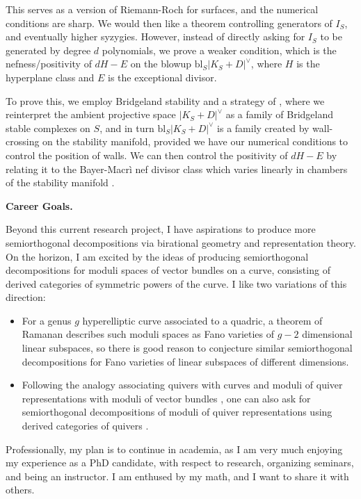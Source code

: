 \documentclass[12pt]{article}
\begin{document}
This serves as a version of Riemann-Roch for surfaces, and the numerical conditions are sharp. We would then like a theorem controlling generators of $I_S$, and eventually higher syzygies. However, instead of directly asking for $I_S$ to be generated by degree $d$ polynomials, we prove a weaker condition, which is the nefness/positivity of $dH - E$ on the blowup $\mathrm{bl}_S |K_S+D|^\vee$, where $H$ is the hyperplane class and $E$ is the exceptional divisor.

To prove this, we employ Bridgeland stability and a strategy of \cite{Arcara_Bertram_2009}, where we reinterpret the ambient projective space $|K_S+D|^\vee$ as a family of Bridgeland stable complexes on $S$, and in turn $\mathrm{bl}_S |K_S+D|^\vee$ is a family created by wall-crossing on the stability manifold, provided we have our numerical conditions to control the position of walls. We can then control the positivity of $dH-E$ by relating it to the Bayer-Macr\`i nef divisor class which varies linearly in chambers of the stability manifold \cite{Bayer_Macrì_2014}.



\textbf{\large Career Goals.}

Beyond this current research project, I have aspirations to produce more semiorthogonal decompositions via birational geometry and representation theory. On the horizon, I am excited by the ideas of \cite{Tevelev_Torres_2023,Tevelev_2023} producing semiorthogonal decompositions for moduli spaces of vector bundles on a curve, consisting of derived categories of symmetric powers of the curve. I like two variations of this direction:

\begin{itemize}
    \item For a genus $g$ hyperelliptic curve associated to a quadric, a theorem of Ramanan \cite{Desale_Ramanan_1976} describes such moduli spaces as Fano varieties of $g-2$ dimensional linear subspaces, so there is good reason \cite{Belmans_Bose_Frei_Gould_Hotchkiss_Lamarche_Petok_Avila_Shah} to conjecture similar semiorthogonal decompositions for Fano varieties of linear subspaces of different dimensions.
    \item Following the analogy associating quivers with curves and moduli of quiver representations with moduli of vector bundles \cite{Hoskins_2018}, one can also ask for semiorthogonal decompositions of moduli of quiver representations using derived categories of quivers \cite{Petrella_2025,Belmans_Brecan_Franzen_Petrella_Reineke_2025}.
\end{itemize}

Professionally, my plan is to continue in academia, as I am very much enjoying my experience as a PhD candidate, with respect to research, organizing seminars, and being an instructor. I am enthused by my math, and I want to share it with others.



\end{document}
